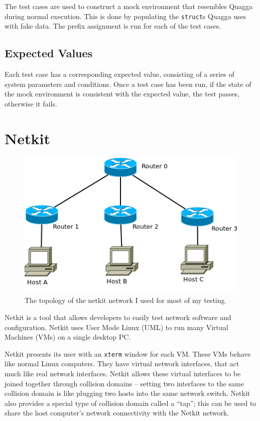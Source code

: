 \documentclass[12pt,a4paper,twoside]{report}
\begin{document}
The test cases are used to construct a mock environment that resembles
Quagga during normal execution. This is done by populating the \texttt{struct}s
Quagga uses with fake data. The prefix assignment is run for each of the test
cases. 

\subsection{Expected Values}
Each test case has a corresponding expected value, consisting of a
series of system parameters and conditions. Once a test case has been run, if
the state of the mock environment is consistent with the expected value, the
test passes, otherwise it fails. 

\section{Netkit} 
\begin{figure}
\begin{center}
	\includegraphics[width=\linewidth]{../Diagrams/Network/MainNetkit.png}
	\caption{The topology of the netkit network I used for most of my testing.}
	\label{fig:NetkitTopology}
\end{center}
\end{figure}
Netkit is a tool that allows developers to easily test network software and
configuration. Netkit uses User Mode Linux (UML)  to run many Virtual Machines (VMs) 
on a single desktop PC. 

Netkit presents its user with an \texttt{xterm} window for each VM\@. These VMs
behave like normal Linux computers. They have virtual network interfaces, that
act much like real network interfaces. Netkit allows these virtual interfaces
to be joined together through collision domains -- setting two interfaces to
the same collision domain is like plugging two hosts into the same network
switch.  Netkit also provides a special type of collision domain called a
``tap''; this can be used to share the host computer's network connectivity
with the Netkit network.
\end{document}
